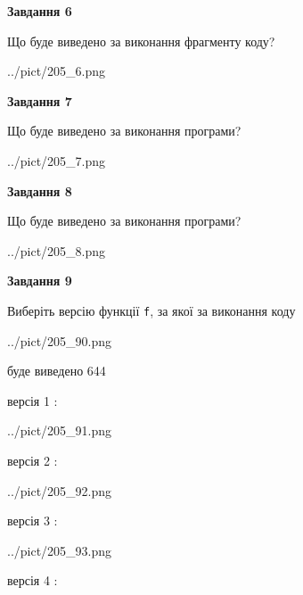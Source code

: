 \documentclass[12pt, ukrainian]{article}
\def\code#1{\Verb!#1!}
\begin{document}
{\begin {large}
{\begin {center}\textbf{Завдання 6}\end {center}}

Що буде виведено за виконання фрагменту коду?\par
\begin{center}
	{../pict/205_6.png}
\end{center}
\newpage

{\begin {center}\textbf{Завдання 7}\end {center}}

Що буде виведено за виконання програми?\par
\begin{center}
	{../pict/205_7.png}
\end{center}
\newpage

{\begin {center}\textbf{Завдання 8}\end {center}}

Що буде виведено за виконання програми?\par
\begin{center}
	{../pict/205_8.png}
\end{center}
\newpage

{\begin {center}\textbf{Завдання 9}\end {center}}

Виберіть версію функції \code{f}, за якої за виконання коду
\begin{center}
	{../pict/205_90.png}
\end{center}
буде виведено 644

\vspace{5mm}
версія 1 :

\begin{center}
	{../pict/205_91.png}
\end{center}
версія 2 :

\begin{center}
	{../pict/205_92.png}
\end{center}
версія 3 :

\begin{center}
	{../pict/205_93.png}
\end{center}
версія 4 :


\end{large}}
\end{document}
